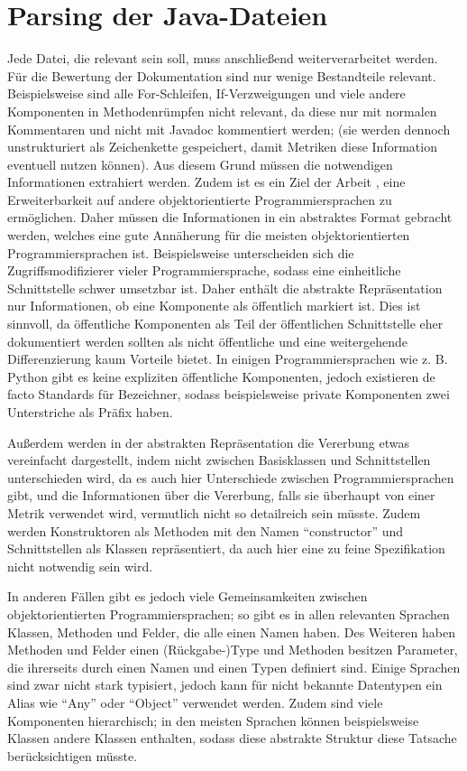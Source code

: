 \section{Parsing der Java-Dateien} 
Jede Datei, die relevant sein soll, muss anschließend weiterverarbeitet werden. Für die Bewertung der Dokumentation sind nur wenige Bestandteile relevant. Beispielsweise sind alle For-Schleifen, If-Verzweigungen und viele andere Komponenten in Methodenrümpfen nicht relevant, da diese nur mit normalen Kommentaren und nicht mit Javadoc kommentiert werden; (sie werden dennoch unstrukturiert als Zeichenkette gespeichert, damit Metriken diese Information eventuell nutzen können). Aus diesem Grund müssen die notwendigen Informationen extrahiert werden. Zudem ist es ein Ziel der Arbeit , eine Erweiterbarkeit auf andere objektorientierte Programmiersprachen zu ermöglichen. Daher müssen die Informationen in ein abstraktes Format gebracht werden, welches eine gute Annäherung für die meisten objektorientierten Programmiersprachen ist. Beispielsweise unterscheiden sich die Zugriffsmodifizierer vieler Programmiersprache, sodass eine einheitliche Schnittstelle schwer umsetzbar ist. Daher enthält die abstrakte Repräsentation nur Informationen, ob eine Komponente als öffentlich markiert ist. Dies ist sinnvoll, da öffentliche Komponenten als Teil der öffentlichen Schnittstelle eher dokumentiert werden sollten als nicht öffentliche und eine weitergehende Differenzierung kaum Vorteile bietet. In einigen Programmiersprachen wie z. B. Python gibt es keine expliziten öffentliche Komponenten, jedoch existieren de facto Standards für Bezeichner, sodass beispielsweise private Komponenten zwei Unterstriche als Präfix haben.

Außerdem werden in der abstrakten Repräsentation die Vererbung etwas vereinfacht dargestellt, indem nicht zwischen Basisklassen und Schnittstellen unterschieden wird, da es auch hier Unterschiede zwischen Programmiersprachen gibt, und die Informationen über die Vererbung, falls sie überhaupt von einer Metrik verwendet wird, vermutlich nicht so detailreich sein müsste. Zudem werden Konstruktoren als Methoden mit den Namen \enquote{constructor} und Schnittstellen als Klassen repräsentiert, da auch hier eine zu feine Spezifikation nicht notwendig sein wird.  

  

In anderen Fällen gibt es jedoch viele Gemeinsamkeiten zwischen objektorientierten Programmiersprachen; so gibt es in  allen relevanten Sprachen Klassen, Methoden und Felder, die alle einen Namen haben. Des Weiteren haben Methoden und Felder einen (Rückgabe-)Type und Methoden besitzen Parameter, die ihrerseits durch einen Namen und einen Typen definiert sind. Einige Sprachen sind zwar nicht stark typisiert, jedoch kann für nicht bekannte Datentypen ein Alias wie \enquote{Any} oder  \enquote{Object} verwendet werden.  Zudem sind viele Komponenten hierarchisch; in den meisten Sprachen können beispielsweise Klassen andere Klassen enthalten, sodass diese abstrakte Struktur diese Tatsache berücksichtigen müsste. 

